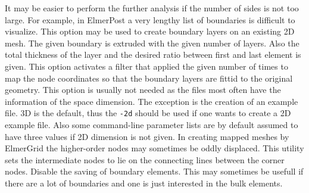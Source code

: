 It may be easier to perform the further analysis if the number of sides is not too large.
For example, in ElmerPost a very lengthy list of boundaries is difficult to visualize.
%
This option may be used to create boundary layers on an existing 2D mesh.
The given boundary is extruded with the given number of layers. Also the total
thickness of the layer and the desired ratio between first and last element
is given.
%
This option activates a filter that applied the given number of times
to map the node coordinates 
so that the boundary layers are fittid to the original geometry.
%
This option is usually not needed as the files most often have the information
of the space dimension. The exception is the creation of an example file.
3D is the default, thus the \texttt{-2d} should be used if one wants to create
a 2D example file. Also some command-line parameter lists are by default assumed to have 
three values if 2D dimension is not given.
%
In creating mapped meshes by ElmerGrid the higher-order nodes may sometimes be 
oddly displaced. This utility sets the intermediate nodes to lie on the connecting lines
between the corner nodes. 
%
Disable the saving of boundary elements.
This may sometimes be usefull if there are a lot of boundaries and one is just interested 
in the bulk elements.

%
%
\sifend


